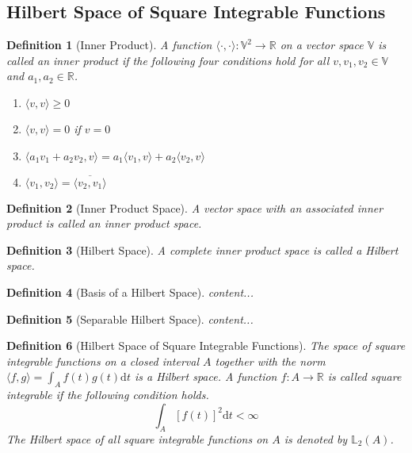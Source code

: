 \documentclass[11pt,twoside,a4paper]{article}
\theoremstyle{MAstyle} \newtheorem{assumption}{Assumption}
\theoremstyle{MAstyle} \newtheorem{definition}{Definition}
\begin{document}
		\subsection{Hilbert Space of Square Integrable Functions}
			\begin{definition}[Inner Product]
				A function $\langle \cdot , \cdot \rangle : \mathbb{V}^2 \rightarrow \mathbb{R}$ on a vector space $\mathbb{V}$ is called an inner product if the following four conditions hold for all $v, v_1, v_2 \in \mathbb{V}$ and $a_1, a_2 \in \mathbb{R}$.
				\begin{multicols}{2}
					\begin{enumerate}
						\item $\langle v,v \rangle \geq 0$
						\item $\langle v,v \rangle = 0$ if $v = 0$
						\item $\langle a_1 v_1 + a_2 v_2, v \rangle = a_1 \langle v_1, v \rangle + a_2 \langle v_2, v \rangle$
						\item $\langle v_1, v_2 \rangle = \overline{\langle v_2, v_1 \rangle}$
					\end{enumerate}
				\end{multicols}
			\end{definition}
			
			\cite{hsing_theoretical_2015}
			\begin{definition}[Inner Product Space]
				A vector space with an associated inner product is called an inner product space.
			\end{definition}
		
			\cite{hsing_theoretical_2015}
			\begin{definition}[Hilbert Space]
				A complete inner product space is called a Hilbert space.
			\end{definition}
		
			\begin{definition}[Basis of a Hilbert Space]
				content...
			\end{definition}
		
			\begin{definition}[Separable Hilbert Space]
				content...
			\end{definition}
		
			\begin{definition}[Hilbert Space of Square Integrable Functions]
				
				The space of square integrable functions on a closed interval $A$ together with the norm $\langle f,g\rangle = \int_A f(t)g(t) \mathrm{d}t$ is a Hilbert space.
				A function $f: A \rightarrow \mathbb{R}$ is called square integrable if the following condition holds.
				\begin{equation}
					\int_{A} \left[f(t)\right]^2\mathrm{d}t < \infty
				\end{equation}
				The Hilbert space of all square integrable functions on $A$ is denoted by $\mathbb{L}_2(A)$.
			\end{definition}
		
\end{document}
